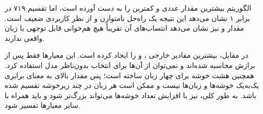 \documentclass[12pt,a4paper,oneside]{report}
\begin{document}
\begin{table}[H]

\centering

\caption{مقایسه نتایج الگوریتم‌های خوشه‌بندی گفتار}

\label{tab:speech-clustering-results}


\end{table}

الگوریتم  بیشترین مقدار عددی
 و کمترین  را به دست آورده است، اما
تقسیم ۷۱۹ در برابر ۱ نشان می‌دهد این نتیجه یک راه‌حل نامتوازن و از نظر
کاربردی ضعیف است. مقدار  و  نیز نشان می‌دهد
انتساب‌های آن تقریباً هیچ هم‌خوانی قابل توجهی با زبان واقعی ندارند.

در مقابل،  بیشترین مقادیر خارجی ،
 و  را ایجاد کرده است. این معیارها فقط
پس از برازش محاسبه شده‌اند و نمی‌توان از آن‌ها برای انتخاب بدون‌ناظر مدل
استفاده کرد. همچنین  هشت خوشه برای چهار زبان ساخته است؛ پس
مقدار بالای  به معنای برابری یک‌به‌یک خوشه‌ها و زبان‌ها نیست و
ممکن است هر زبان در چند زیرخوشه تقسیم شده باشد. به طور کلی، 
نیز با افزایش تعداد خوشه‌ها می‌تواند بزرگ‌تر شود و باید همراه با سایر
معیارها تفسیر شود.
\end{document}
